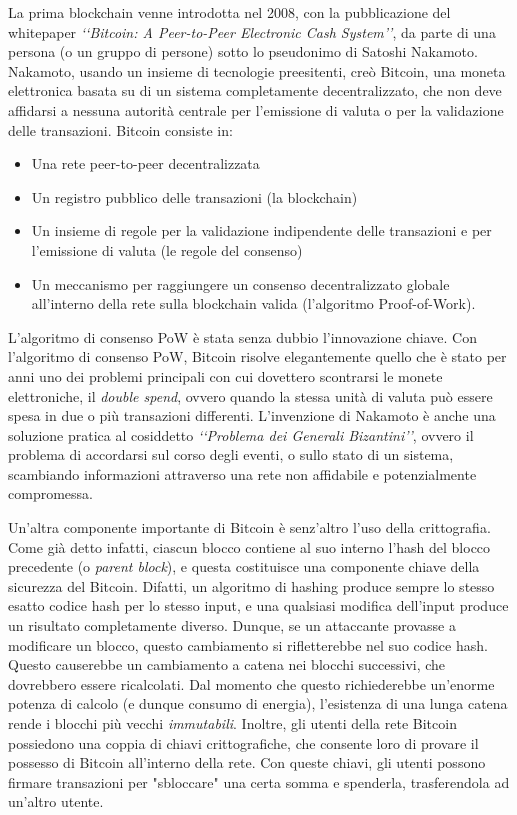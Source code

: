 La prima blockchain venne introdotta nel 2008, con la pubblicazione del whitepaper \textit{‘‘Bitcoin: A Peer-to-Peer Electronic Cash System’’}\cite{K1}, da parte di una persona (o un gruppo di persone) sotto lo pseudonimo di Satoshi Nakamoto. Nakamoto, usando un insieme di tecnologie preesitenti, creò Bitcoin, una moneta elettronica basata su di un sistema completamente decentralizzato, che non deve affidarsi a nessuna autorità centrale per l'emissione di valuta o per la validazione delle transazioni. Bitcoin consiste in:
\begin{itemize}
    \item Una rete peer-to-peer decentralizzata
    \item Un registro pubblico delle transazioni (la blockchain)
    \item Un insieme di regole per la validazione indipendente delle transazioni e per l'emissione di valuta (le regole del consenso)
    \item Un meccanismo per raggiungere un consenso decentralizzato globale all'interno della rete sulla blockchain valida (l'algoritmo Proof-of-Work).
\end{itemize}L'algoritmo di consenso PoW è stata senza dubbio l'innovazione chiave. Con l'algoritmo di consenso PoW, Bitcoin risolve elegantemente quello che è stato per anni uno dei problemi principali con cui dovettero scontrarsi le monete elettroniche, il \textit{double spend}, ovvero quando la stessa unità di valuta può essere spesa in due o più transazioni differenti. L'invenzione di Nakamoto è anche una soluzione pratica al cosiddetto \textit{‘‘Problema dei Generali Bizantini’’}, ovvero il problema di accordarsi sul corso degli eventi, o sullo stato di un sistema, scambiando informazioni attraverso una rete non affidabile e potenzialmente compromessa. 

Un'altra componente importante di Bitcoin è senz'altro l'uso della crittografia. Come già detto infatti, ciascun blocco contiene al suo interno l'hash del blocco precedente (o \textit{parent block}), e questa costituisce una componente chiave della sicurezza del Bitcoin. Difatti, un algoritmo di hashing produce sempre lo stesso esatto codice hash per lo stesso input, e una qualsiasi modifica dell'input produce un risultato completamente diverso. Dunque, se un attaccante provasse a modificare un blocco, questo cambiamento si rifletterebbe nel suo codice hash. Questo causerebbe un cambiamento a catena nei blocchi successivi, che dovrebbero essere ricalcolati. Dal momento che questo richiederebbe un'enorme potenza di calcolo (e dunque consumo di energia), l'esistenza di una lunga catena rende i blocchi più vecchi \textit{immutabili}. Inoltre, gli utenti della rete Bitcoin possiedono una coppia di chiavi crittografiche, che consente loro di provare il possesso di Bitcoin all'interno della rete. Con queste chiavi, gli utenti possono firmare transazioni per "sbloccare" una certa somma e spenderla, trasferendola ad un'altro utente.

